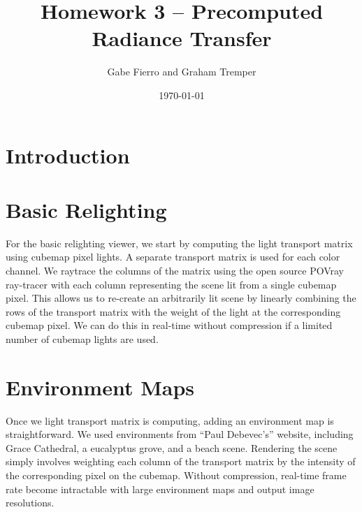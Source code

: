 \documentclass[11pt]{article}
\begin{document}
\title{Homework 3 -- Precomputed Radiance Transfer}
\author{Gabe Fierro and Graham Tremper}
\date{\today}
\maketitle

\section{Introduction}

\section{Basic Relighting}
For the basic relighting viewer, we start by computing the light transport matrix using cubemap pixel lights. A separate transport matrix is used for each color channel. We raytrace the columns of the matrix using the open source POVray ray-tracer with each column representing the scene lit from a single cubemap pixel. This allows us to re-create an arbitrarily lit scene by linearly combining the rows of the transport matrix with the weight of the light at the corresponding cubemap pixel. We can do this in real-time without compression if a limited number of cubemap lights are used.

\section{Environment Maps}
Once we light transport matrix is computing, adding an environment map is straightforward. We used environments from ``Paul Debevec's'' website, including Grace Cathedral, a eucalyptus grove, and a beach scene. Rendering the scene simply involves weighting each column of the transport matrix by the intensity of the corresponding pixel on the cubemap. Without compression, real-time frame rate become intractable with large environment maps and output image resolutions.
\end{document}
